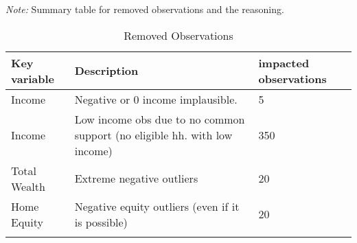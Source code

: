 
\begin{landscape}
\begin{singlespace}
			\def\sym#1{\ifmmode^{#1}\else\(^{#1}\)\fi}
			\begin{ThreePartTable}
				\begin{TableNotes}
					\begin{scriptsize}
					\item \textit{Note:} Summary table for removed observations and the reasoning. 	
					\end{scriptsize}
				\end{TableNotes}
				
				\begin{longtable}{l C{15cm} C{5cm}}
					\caption{Removed Observations}\label{tab_drop_observations}\\
					\toprule
					Key variable & Description & impacted observations  \\
					\midrule
					Income & Negative or 0 income implausible. & 5 \\
					Income & Low income obs due to no common support (no eligible hh. with low income) & 350 \\
				 	Total Wealth & Extreme negative outliers & 20 \\
				 	Home Equity & Negative equity outliers (even if it is possible) & 20 \\
					\midrule
					\bottomrule
				\insertTableNotes \\
				\end{longtable} 

				
			\end{ThreePartTable}
\end{singlespace} 
\end{landscape}
